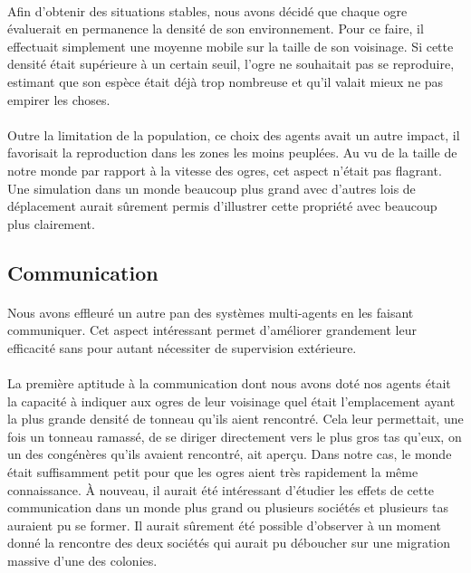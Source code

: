 \paragraph{}
Afin d'obtenir des situations stables, nous avons décidé que chaque ogre
évaluerait en permanence la densité de son environnement. Pour ce faire, il
effectuait simplement une moyenne mobile sur la taille de son voisinage. Si
cette densité était supérieure à un certain seuil, l'ogre ne souhaitait pas se
reproduire, estimant que son espèce était déjà trop nombreuse et qu'il valait
mieux ne pas empirer les choses.

\paragraph{}
Outre la limitation de la population, ce choix des agents avait un autre impact,
il favorisait la reproduction dans les zones les moins peuplées. Au vu de la
taille de notre monde par rapport à la vitesse des ogres, cet aspect n'était pas
flagrant. Une simulation dans un monde beaucoup plus grand avec d'autres lois de
déplacement aurait sûrement permis d'illustrer cette propriété avec beaucoup
plus clairement.

\subsection{Communication}
\paragraph{}
Nous avons effleuré un autre pan des systèmes multi-agents en les faisant
communiquer. Cet aspect intéressant permet d'améliorer grandement leur
efficacité sans pour autant nécessiter de supervision extérieure.

\paragraph{}
La première aptitude à la communication dont nous avons doté nos agents était la
capacité à indiquer aux ogres de leur voisinage quel était l'emplacement ayant
la plus grande densité de tonneau qu'ils aient rencontré. Cela leur permettait,
une fois un tonneau ramassé, de se diriger directement vers le plus gros tas
qu'eux, on un des congénères qu'ils avaient rencontré, ait aperçu. Dans notre
cas, le monde était suffisamment petit pour que les ogres aient très rapidement
la même connaissance. À nouveau, il aurait été intéressant d'étudier les effets
de cette communication dans un monde plus grand ou plusieurs sociétés et
plusieurs tas auraient pu se former. Il aurait sûrement été possible d'observer
à un moment donné la rencontre des deux sociétés qui aurait pu déboucher sur une
migration massive d'une des colonies.

